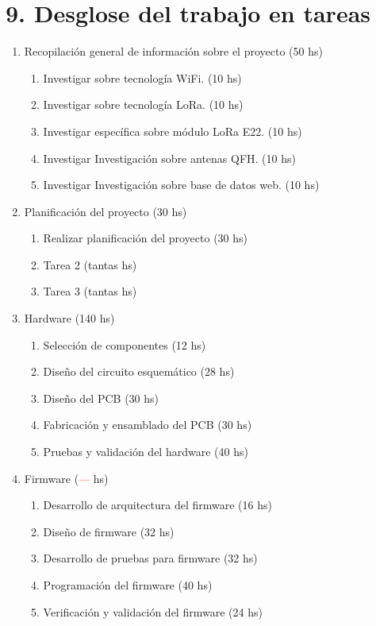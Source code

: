 \documentclass[
11pt, %
codirector, %
]{charter}
\begin{document}
\section{9. Desglose del trabajo en tareas}
\label{sec:wbs}

\begin{enumerate}
\item Recopilación general de información sobre el proyecto (50 hs)
	\begin{enumerate}
	\item Investigar sobre tecnología WiFi. (10 hs)
	\item Investigar sobre tecnología LoRa. (10 hs)
	\item Investigar específica sobre módulo LoRa E22. (10 hs)
	\item Investigar Investigación sobre antenas QFH. (10 hs)
	\item Investigar Investigación sobre base de datos web. (10 hs)
	\end{enumerate}
\item Planificación del proyecto (30 hs)
	\begin{enumerate}
	\item Realizar planificación del proyecto (30 hs)
	\item Tarea 2 (tantas hs)
	\item Tarea 3 (tantas hs)
	\end{enumerate}
\item Hardware (140 hs)
	\begin{enumerate}
	\item Selección de componentes (12 hs)
	\item Diseño del circuito esquemático (28 hs)
	\item Diseño del PCB (30 hs)
	\item Fabricación y ensamblado del PCB (30 hs)
	\item Pruebas y validación del hardware (40 hs)
	\end{enumerate}
\item Firmware (\textcolor{red}{---} hs)
	\begin{enumerate}
	\item Desarrollo de arquitectura del firmware (16 hs)
	\item Diseño de firmware (32 hs)
	\item Desarrollo de pruebas para firmware (32 hs)
	\item Programación del firmware (40 hs)
	\item Verificación y validación del firmware (24 hs)

\end{enumerate}
\end{enumerate}
\end{document}
